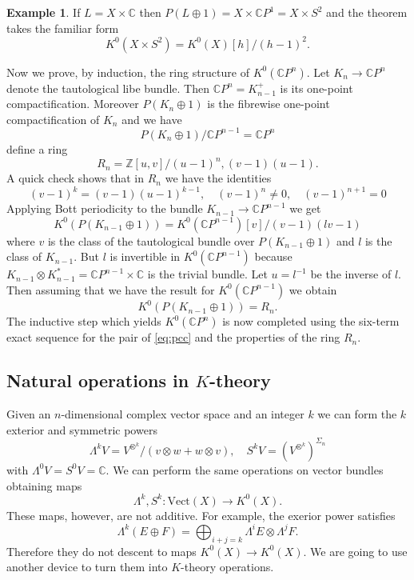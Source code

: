 \documentclass[a4paper,10pt]{article}
\theoremstyle{plain}%
\theoremstyle{definition}
\newtheorem{exmp}{Example}
\theoremstyle{remark}
\newcommand{\ZZ}{\mathbb{Z}}
\newcommand{\CC}{\mathbb{C}}
\newcommand{\cp}{\CC P}   %
\newcommand{\Vect}{\mathrm{Vect}}  %
\begin{document}
\begin{exmp}
If $L=X\times \CC$ then $P(L\oplus 1)=X\times \cp^1=X\times S^2$ and the theorem takes the familiar form 
$$K^0(X\times S^2)=K^0(X)[h]/(h-1)^2.$$
\end{exmp}

Now we prove, by induction, the ring structure of $K^0(\cp^n)$. Let $K_n\to \cp^n$ denote the tautological libe bundle. Then $\cp^n=K_{n-1}^+$ is its one-point compactification. Moreover $P(K_n\oplus 1)$ is the fibrewise one-point compactification of $K_n$ and we have
\begin{equation}\label{eq:pcc}P(K_n\oplus 1)/\cp^{n-1}=\cp^n\end{equation}
define a ring
$$R_n=\ZZ[u,v]/(u-1)^n,(v-1)(u-1).$$
A quick check shows that in $R_n$ we have the identities
$$(v-1)^k=(v-1)(u-1)^{k-1},\quad (v-1)^n\neq 0, \quad (v-1)^{n+1}=0$$
Applying Bott periodicity to the bundle $K_{n-1}\to\cp^{n-1}$ we get
$$K^0(P(K_{n-1}\oplus 1)) = K^0(\cp^{n-1})[v]/(v-1)(lv-1)$$
where $v$ is the class of the tautological bundle over $P(K_{n-1}\oplus 1)$ and $l$ is the class of $K_{n-1}$. But $l$ is invertible in $K^0(\cp^{n-1})$ because $K_{n-1}\otimes K_{n-1}^\ast=\cp^{n-1}\times \CC$ is the trivial bundle. Let $u=l^{-1}$ be the inverse of $l$. Then assuming that we have the result for $K^0(\cp^{n-1})$ we obtain
$$K^0(P(K_{n-1}\oplus 1))=R_n.$$
The inductive step which yields $K^0(\cp^n)$ is now completed using the six-term exact sequence for the pair of \eqref{eq:pcc} and the properties of the ring $R_n$.

\subsection{Natural operations in $K$-theory}

Given an $n$-dimensional complex vector space and an integer $k$ we can form the $k$ exterior and symmetric powers
$$\Lambda^k V=V^{\otimes^k}/(v\otimes w+w\otimes v),\quad S^kV=(V^{\otimes^k})^{\Sigma_n}$$
with $\Lambda^0V=S^0V=\CC$. We can perform the same operations on vector bundles obtaining maps
$$\Lambda^k, S^k:\Vect(X)\to K^0(X).$$
These maps, however, are not additive. For example, the exerior power satisfies
$$\Lambda^k(E\oplus F)=\bigoplus_{i+j=k} \Lambda^i E\otimes \Lambda^j F.$$
Therefore they do not descent to maps $K^0(X)\to K^0(X)$. We are going to use another device to turn them into $K$-theory operations.
\end{document}
